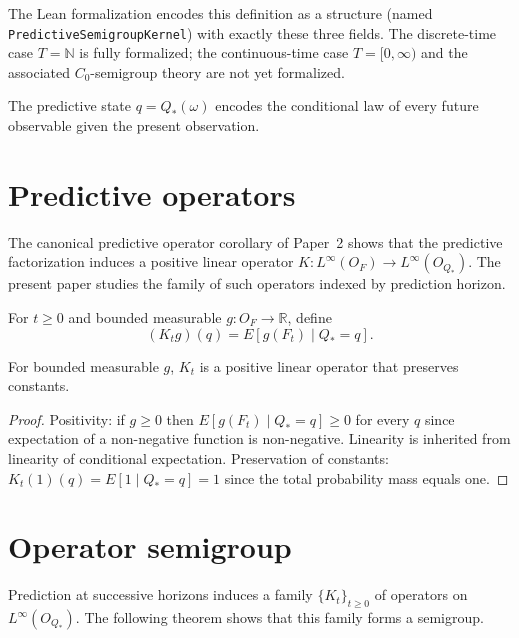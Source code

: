 \begin{remark}
The Lean formalization encodes this definition as a structure (named
\texttt{PredictiveSemigroupKernel}) with exactly these three fields.
The discrete-time case $T=\mathbb{N}$ is fully formalized; the
continuous-time case $T=[0,\infty)$ and the associated
$C_0$-semigroup theory are not yet formalized.
\end{remark}

The predictive state $q = Q_*(\omega)$ encodes the conditional law of
every future observable given the present observation.

\section{Predictive operators}\label{sec:operators}

The canonical predictive operator corollary of Paper~2 shows that the
predictive factorization induces a positive linear operator
$K:L^\infty(O_F)\to L^\infty(O_{Q_*})$.  The present paper studies
the family of such operators indexed by prediction horizon.

\begin{definition}\label{def:predictive-operator}
For $t\ge0$ and bounded measurable $g:O_F\to\mathbb R$, define
\[
(K_t g)(q)
=
E[g(F_t) \mid Q_*=q].
\]
\end{definition}

\begin{proposition}\label{prop:positivity}
For bounded measurable $g$, $K_t$ is a positive linear operator that
preserves constants.
\end{proposition}

\begin{proof}
Positivity: if $g\ge0$ then $E[g(F_t)\mid Q_*=q]\ge0$ for every $q$ since
expectation of a non-negative function is non-negative.  Linearity is
inherited from linearity of conditional expectation.  Preservation of
constants: $K_t(1)(q)=E[1\mid Q_*=q]=1$ since the total probability mass
equals one.
\end{proof}

\section{Operator semigroup}\label{sec:semigroup}

Prediction at successive horizons induces a family $\{K_t\}_{t\ge0}$
of operators on $L^\infty(O_{Q_*})$.  The following theorem shows that
this family forms a semigroup.

